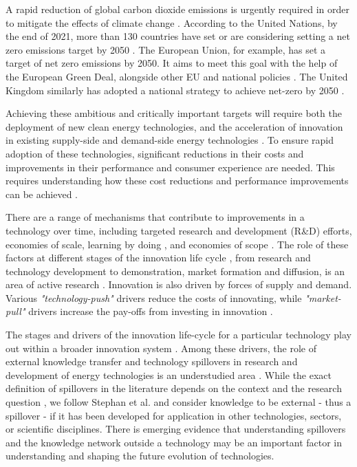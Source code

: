 \documentclass[journal=jacsat,manuscript=article]{achemso}
\begin{document}
A rapid reduction of global carbon dioxide emissions is urgently required in order to mitigate the effects of climate change \cite{Forster2019}. According to the United Nations, by the end of 2021, more than 130 countries have set or are considering setting a net zero emissions target by 2050 \cite{un2021climate}. The European Union, for example, has set a target of net zero emissions by 2050. It aims to meet this goal with the help of the European Green Deal, alongside other EU and national policies \cite{eu2020green}. The United Kingdom similarly has adopted a national strategy to achieve net-zero by 2050 \cite{noauthor_ieairena_2023}.

Achieving these ambitious and critically important targets will require both the deployment of new clean energy technologies, and the acceleration of innovation in existing supply-side \cite{sinn2012green} and demand-side energy technologies \cite{rgeVorsatz2009}. To ensure rapid adoption of these technologies, significant reductions in their costs and improvements in their performance and consumer experience are needed. This requires understanding how these cost reductions and performance improvements can be achieved \cite{Stephan2021} \cite{Ziegler2021}.

There are a range of mechanisms that contribute to improvements in a technology over time, including targeted research and development (R\&D) efforts, economies of scale, learning by doing \cite{Arrow1971}, and economies of scope \cite{johansson2012global}\cite{national2016power}\cite{iea2020perspectives}. The role of these factors at different stages of the innovation life cycle \cite{ grubler2012policies}, from research and technology development to demonstration, market formation and diffusion, is an area of active research \cite{Mowery1979} \cite{kavlak2018evaluating} \cite{Ziegler2021}. Innovation is also driven by forces of supply and demand. Various \textit{"technology-push"} drivers reduce the costs of innovating, while \textit{"market-pull"} drivers increase the pay-offs from investing in innovation \cite{anadon2009policy}.

The stages and drivers of the innovation life-cycle for a particular technology play out within a broader innovation system \cite{grubler2012policies}\cite{Anadon2016}. Among these drivers, the role of external  knowledge transfer and technology spillovers in research and development of energy technologies is an understudied area  \cite{Stephan2021}. While the exact definition of spillovers in the literature depends on the context and the research question \cite{Liu2003}\cite{Nemet2012}, we follow Stephan et al. \cite{Stephan2021} and consider knowledge to be external - thus a spillover -  if it has been developed for application in other technologies, sectors, or scientific disciplines. There is emerging evidence that understanding spillovers and the knowledge network outside a technology may be an important factor in understanding \cite{Pichler2020} and shaping \cite{Clark2016}\cite{Stephan2021}\cite{Sun2021}\cite{kolesnikov2022technology} the future evolution of technologies.  
\end{document}
